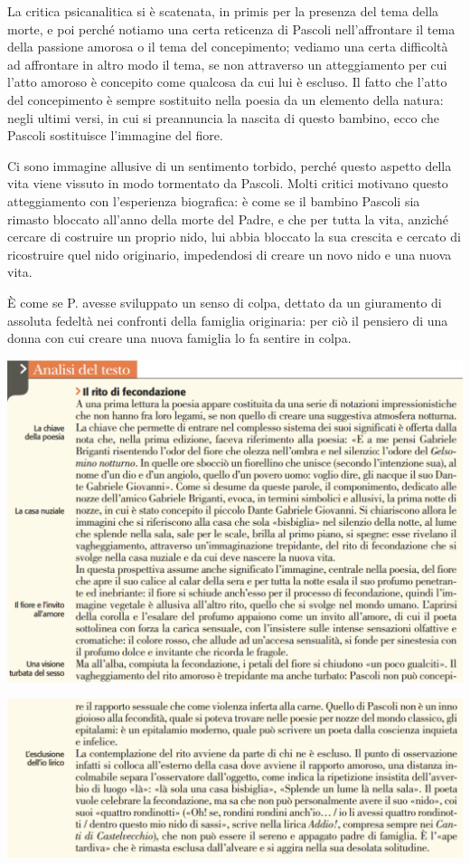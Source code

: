 \documentclass[a4paper, twoside, titlepage]{book}
\begin{document}
La critica psicanalitica si è scatenata, in primis per la presenza del tema della morte, e poi perché notiamo una certa reticenza di Pascoli nell'affrontare il tema della passione amorosa o il tema del concepimento; vediamo una certa difficoltà ad affrontare in altro modo il tema, se non attraverso un atteggiamento per cui l'atto amoroso è concepito come qualcosa da cui lui è escluso.
Il fatto che l'atto del concepimento è sempre sostituito nella poesia da un elemento della natura: negli ultimi versi, in cui si preannuncia la nascita di questo bambino, ecco che Pascoli sostituisce l'immagine del fiore.

Ci sono immagine allusive di un sentimento torbido, perché questo aspetto della vita viene vissuto in modo tormentato da Pascoli. Molti critici motivano questo atteggiamento con l'esperienza biografica: è come se il bambino Pascoli sia rimasto bloccato all'anno della morte del Padre, e che per tutta la vita, anziché cercare di costruire un proprio nido, lui abbia bloccato la sua crescita e cercato di ricostruire quel nido originario, impedendosi di creare un novo nido e una nuova vita.

È come se P. avesse sviluppato un senso di colpa, dettato da un giuramento di assoluta fedeltà nei confronti della famiglia originaria: per ciò il pensiero di una donna con cui creare una nuova famiglia lo fa sentire in colpa.

\begin{center}
\includegraphics[width=\textwidth]{gelsomino1}
\end{center}
\vfill
\begin{center}
\includegraphics[width=\textwidth]{gelsomino2}
\end{center}
\end{document}
